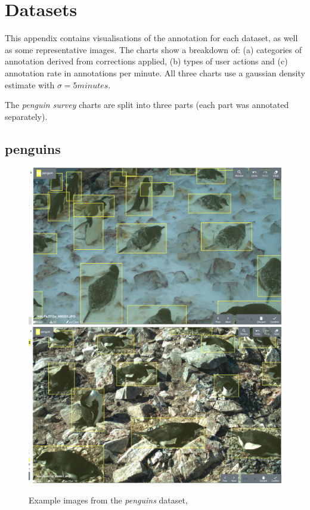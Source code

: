 \chapter{Datasets}
\label{chap:datasets} 

This appendix contains visualisations of the annotation for each dataset, as well as some representative images. The charts show a breakdown of: (a) categories of annotation derived from corrections applied, (b) types of user actions and (c) annotation rate in annotations per minute. All three charts use a gaussian density estimate with $\sigma=5 minutes$. 

The \emph{penguin survey} charts are split into three parts (each part was annotated separately).

\newpage
\section{penguins}
\label{sec:penguins_details}

\begin{figure}[!h]
\centering
  \includegraphics[width=0.475\linewidth]{figures/annotation/screenshots/penguins.png}
  \hfill
  \includegraphics[width=0.475\linewidth]{figures/annotation/screenshots/penguins2.png}

\caption{Example images from the \emph{penguins} dataset, \cite{PenguinData}}
\label{fig:penguin_dataset}
\end{figure}

